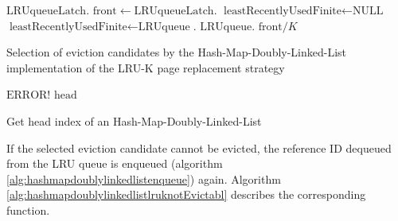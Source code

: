 \begin{@empty}
    \begin{algorithm}[h]
        \scriptsize
        \begin{algorithmic}[1]
                \State $\text{LRUqueueLatch}.$
                \State $\text{front} \gets \text{LRUqueueLatch}.$
                        \State $\text{leastRecentlyUsedFinite} \gets \text{NULL}$
                    \Else
                        \State $\text{leastRecentlyUsedFinite} \gets \text{LRUqueue}$.
                    \EndIf
                \EndIf
                \State $\text{LRUqueue}$.
                \State \Return $\text{front} / K$
            \EndFunction
        \end{algorithmic}
        \vspace{1em}
        \caption[{\footnotesize \textbf{function} \textsc{select}} of Hash-Map-Doubly-Linked-List LRU-K]{Selection of eviction candidates by the Hash-Map-Doubly-Linked-List implementation of the LRU-K page replacement strategy}
        \label{alg:hashmapdoublylinkedlistlrukselect}
    \end{algorithm}
\end{@empty}

\begin{@empty}
    \begin{algorithm}[h]
        \scriptsize
        \begin{algorithmic}[1]
                    \State \Return $\text{ERROR!}$
                \Else
                    \State \Return $\text{head}$
                \EndIf
            \EndFunction
        \end{algorithmic}
        \vspace{1em}
        \caption[{\footnotesize \textbf{function} \textsc{getFront}} of Hash-Map-Doubly-Linked-List]{Get head index of an Hash-Map-Doubly-Linked-List}
        \label{alg:hashmapdoublylinkedlistgetfront}
    \end{algorithm}
\end{@empty}

    If the selected eviction candidate cannot be evicted, the reference ID dequeued from the LRU queue is enqueued (algorithm \ref{alg:hashmapdoublylinkedlistenqueue}) again. Algorithm \ref{alg:hashmapdoublylinkedlistlruknotEvictabl} describes the corresponding function.

